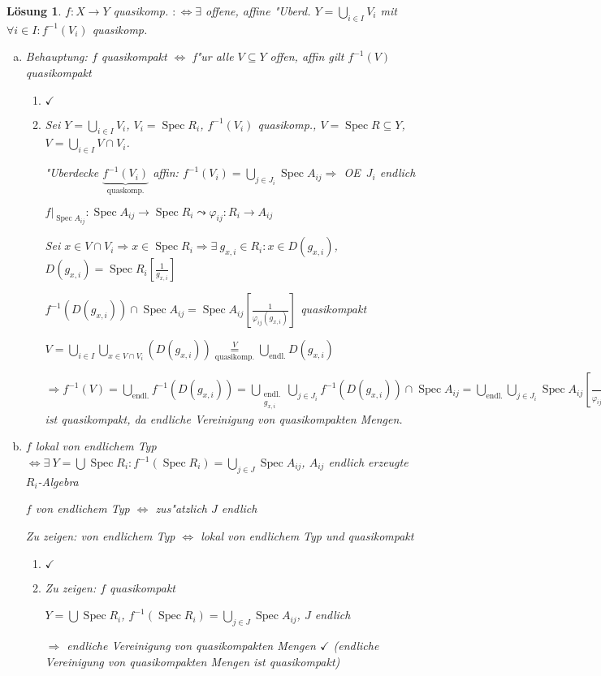 \documentclass[paper = A4, fontsize=12pt, numbers=noendperiod, chapterprefix=true]{scrbook}
\theoremstyle{break}
\newtheorem{Loes}{L\"osung}
\theoremstyle{nonumberbreak}
\theoremstyle{nonumberplain}
\newcommand{\quot}[1]{\textrm{\glqq}{#1}\textrm{\grqq}}
\newcommand{\Bigcup}{\bigcup\limits}
\newenvironment{twosidedproof}{\begin{enumerate}[\quot{$\Rightarrow$}:]}{\end{enumerate}}
\newcommand{\proofforward}{\item[\quot{$\Rightarrow$}:]}
\newcommand{\proofreverse}{\item[\quot{$\Leftarrow$}:]}
\DeclareMathOperator{\Spec}{Spec}
\renewcommand{\OE}{O\!\!E~}
\begin{document}
\begin{Loes}
$f: X \to Y$ quasikomp. $:\Leftrightarrow \exists$ offene, affine "Uberd. $Y = \Bigcup_{i\in I} V_i$ mit $\forall i \in I: f^{-1}(V_i)$ quasikomp.
\begin{enumerate}[a)]
\item
	\emph{Behauptung:} $f$ quasikompakt $\Leftrightarrow$ f"ur alle $V \subseteq Y$ offen, affin gilt $f^{-1}(V)$ quasikompakt
	\begin{twosidedproof}
	\proofforward
		$\checkmark$
	\proofreverse
		Sei $Y = \Bigcup_{i\in I} V_i$, $V_i = \Spec R_i$, $f^{-1}(V_i)$ quasikomp., $V = \Spec R \subseteq Y$, $V = \Bigcup_{i \in I} V \cap V_i$.
		
		"Uberdecke $\underbrace{f^{-1}(V_i)}_{\text{quaskomp.}}$ affin: $f^{-1}(V_i) = \Bigcup_{j \in J_i} \Spec A_{ij} \Rightarrow$ \OE $J_i$ endlich
		
		$f|_{\Spec A_{ij}}: \Spec A_{ij} \to \Spec R_i \leadsto \varphi_{ij}: R_i \to A_{ij}$
		
		Sei $x \in V \cap V_i \Rightarrow x \in \Spec R_i \Rightarrow \exists \ g_{x,i} \in R_i: x \in D(g_{x,i})$, $D(g_{x,i}) = \Spec R_i [\frac{1}{g_{x,i}}]$
		
		$f^{-1}(D(g_{x,i})) \cap \Spec A_{ij} = \Spec A_{ij}[\frac{1}{\varphi_{ij}(g_{x,i})}]$ quasikompakt
		
		$V = \Bigcup_{i \in I} \Bigcup_{x \in V \cap V_i} (D(g_{x,i})) \overset{V}{\underset{\text{quasikomp.}}{=}} \Bigcup_{\text{endl.}} D(g_{x,i})$
		
		$\Rightarrow f^{-1}(V) = \Bigcup_{\text{endl.}} f^{-1} (D(g_{x,i})) = \Bigcup_{\substack{\text{endl.} \\ g_{x,i}}} \Bigcup_{j \in J_i} f^{-1} (D(g_{x,i})) \cap \Spec A_{ij} = \Bigcup_{\text{endl.}} \bigcup_{j \in J_i} \Spec A_{ij} [\frac{1}{\varphi_{ij}(g_{x,i})}]$ ist quasikompakt, da endliche Vereinigung von quasikompakten Mengen.
	\end{twosidedproof}
\item
	$f$ lokal von endlichem Typ $\Leftrightarrow \exists \ Y = \bigcup \Spec R_i: f^{-1}(\Spec R_i) = \bigcup_{j \in J} \Spec A_{ij}$, $A_{ij}$ endlich erzeugte $R_i$-Algebra
	
	$f$ von endlichem Typ $\Leftrightarrow$ zus"atzlich $J$ endlich
	
	\emph{Zu zeigen:} von endlichem Typ $\Leftrightarrow$ lokal von endlichem Typ und quasikompakt
	\begin{twosidedproof}
	\proofreverse
		$\checkmark$
	\proofforward
		\emph{Zu zeigen:} $f$ quasikompakt
		
		$Y = \bigcup \Spec R_i$, $f^{-1}(\Spec R_i) = \Bigcup_{j \in J} \Spec A_{ij}$, $J$ endlich
		
		$\Rightarrow$ endliche Vereinigung von quasikompakten Mengen $\checkmark$ (endliche Vereinigung von quasikompakten Mengen ist quasikompakt)
	\end{twosidedproof}
\end{enumerate}\end{Loes}
\end{document}
